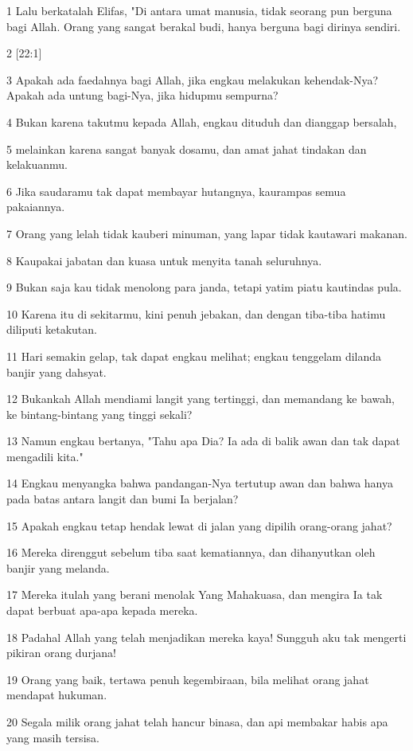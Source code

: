\par 1 Lalu berkatalah Elifas, "Di antara umat manusia, tidak seorang pun berguna bagi Allah. Orang yang sangat berakal budi, hanya berguna bagi dirinya sendiri.
\par 2 [22:1]
\par 3 Apakah ada faedahnya bagi Allah, jika engkau melakukan kehendak-Nya? Apakah ada untung bagi-Nya, jika hidupmu sempurna?
\par 4 Bukan karena takutmu kepada Allah, engkau dituduh dan dianggap bersalah,
\par 5 melainkan karena sangat banyak dosamu, dan amat jahat tindakan dan kelakuanmu.
\par 6 Jika saudaramu tak dapat membayar hutangnya, kaurampas semua pakaiannya.
\par 7 Orang yang lelah tidak kauberi minuman, yang lapar tidak kautawari makanan.
\par 8 Kaupakai jabatan dan kuasa untuk menyita tanah seluruhnya.
\par 9 Bukan saja kau tidak menolong para janda, tetapi yatim piatu kautindas pula.
\par 10 Karena itu di sekitarmu, kini penuh jebakan, dan dengan tiba-tiba hatimu diliputi ketakutan.
\par 11 Hari semakin gelap, tak dapat engkau melihat; engkau tenggelam dilanda banjir yang dahsyat.
\par 12 Bukankah Allah mendiami langit yang tertinggi, dan memandang ke bawah, ke bintang-bintang yang tinggi sekali?
\par 13 Namun engkau bertanya, "Tahu apa Dia? Ia ada di balik awan dan tak dapat mengadili kita."
\par 14 Engkau menyangka bahwa pandangan-Nya tertutup awan dan bahwa hanya pada batas antara langit dan bumi Ia berjalan?
\par 15 Apakah engkau tetap hendak lewat di jalan yang dipilih orang-orang jahat?
\par 16 Mereka direnggut sebelum tiba saat kematiannya, dan dihanyutkan oleh banjir yang melanda.
\par 17 Mereka itulah yang berani menolak Yang Mahakuasa, dan mengira Ia tak dapat berbuat apa-apa kepada mereka.
\par 18 Padahal Allah yang telah menjadikan mereka kaya! Sungguh aku tak mengerti pikiran orang durjana!
\par 19 Orang yang baik, tertawa penuh kegembiraan, bila melihat orang jahat mendapat hukuman.
\par 20 Segala milik orang jahat telah hancur binasa, dan api membakar habis apa yang masih tersisa.
